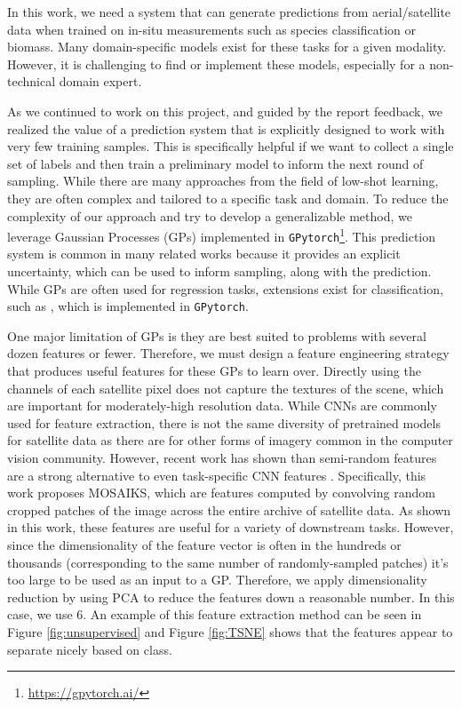 In this work, we need a system that can generate predictions from aerial/satellite data when trained on in-situ measurements such as species classification or biomass. Many domain-specific models exist for these tasks for a given modality. However, it is challenging to find or implement these models, especially for a non-technical domain expert. 

As we continued to work on this project, and guided by the report feedback, we realized the value of a prediction system that is explicitly designed to work with very few training samples. This is specifically helpful if we want to collect a single set of labels and then train a preliminary model to inform the next round of sampling. While there are many approaches from the field of low-shot learning, they are often complex and tailored to a specific task and domain. To reduce the complexity of our approach and try to develop a generalizable method, we leverage Gaussian Processes (GPs) \cite{Rasmussen2004} implemented in \texttt{GPytorch}\footnote{\url{https://gpytorch.ai/}}. This prediction system is common in many related works because it provides an explicit uncertainty, which can be used to inform sampling, along with the prediction. While GPs are often used for regression tasks, extensions exist for classification, such as \cite{milios2018dirichletbased}, which is implemented in \texttt{GPytorch}.

One major limitation of GPs is they are best suited to problems with several dozen features or fewer. Therefore, we must design a feature engineering strategy that produces useful features for these GPs to learn over. Directly using the channels of each satellite pixel does not capture the textures of the scene, which are important for moderately-high resolution data. While CNNs are commonly used for feature extraction, there is not the same diversity of pretrained models for satellite data as there are for other forms of imagery common in the computer vision community. However, recent work has shown than semi-random features are a strong alternative to even task-specific CNN features \cite{Rolf2021}. Specifically, this work proposes MOSAIKS, which are features computed by convolving random cropped patches of the image across the entire archive of satellite data. As shown in this work, these features are useful for a variety of downstream tasks. However, since the dimensionality of the feature vector is often in the hundreds or thousands (corresponding to the same number of randomly-sampled patches) it's too large to be used as an input to a GP. Therefore, we apply dimensionality reduction by using PCA to reduce the features down a reasonable number. In this case, we use 6. An example of this feature extraction method can be seen in Figure \ref{fig:unsupervised} and Figure \ref{fig:TSNE} shows that the features appear to separate nicely based on class.


